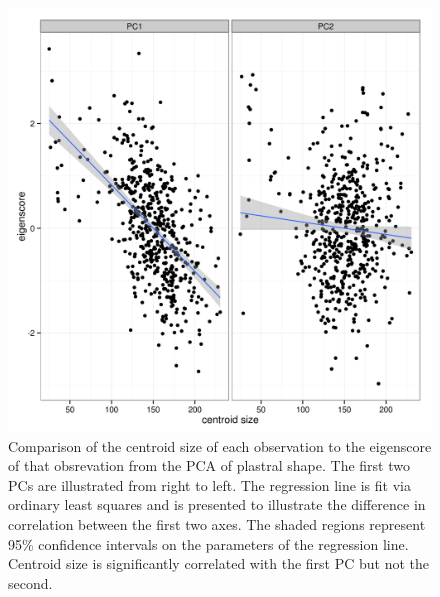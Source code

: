 \documentclass[12pt,letterpaper]{article}\usepackage{graphicx, color}
\begin{document}
\begin{figure}[ht]
  \centering
  \includegraphics[width = \textwidth]{figure/cent_size}
  \caption{Comparison of the centroid size of each observation to the eigenscore of that obsrevation from the PCA of plastral shape. The first two PCs are illustrated from right to left. The regression line is fit via ordinary least squares and is presented to illustrate the difference in correlation between the first two axes. The shaded regions represent 95\% confidence intervals on the parameters of the regression line. Centroid size is significantly correlated with the first PC but not the second.}
  \label{fig:cent}
\end{figure}
\end{document}
